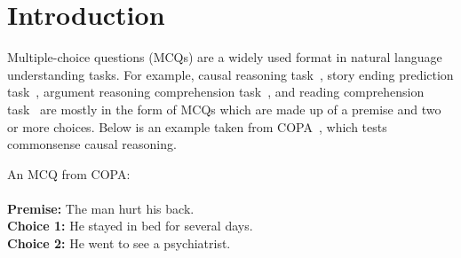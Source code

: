 \section{Introduction}
\label{sec:intro}

Multiple-choice questions (MCQs) are a widely used format  
in natural language understanding tasks. 
For example, causal reasoning task~\cite{copa2012}, story ending prediction task~\cite{roc2017},
argument reasoning comprehension task~\cite{arct2018}, and reading comprehension task~\cite{yu2020reclor}
are mostly in the form of MCQs which are made up of a premise and 
two or more choices. Below is an example taken 
from COPA~\cite{copa2012}, which tests commonsense causal 
reasoning.

\begin{example}\label{ex:copa}
An MCQ from COPA:\\ \\
\noindent
\textbf{Premise:} The man hurt his back.\\
\textbf{Choice 1:} He stayed in bed for several days.  \checksymbol \\
\textbf{Choice 2:} He went to see a psychiatrist. \crosssymbol 
\end{example}

